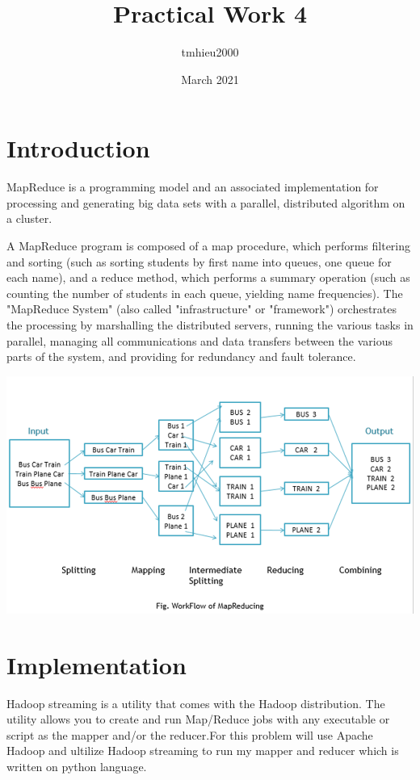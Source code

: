\documentclass{article}
\title{Practical Work 4}
\author{tmhieu2000}
\date{March 2021}
\begin{document}
\maketitle

\section{Introduction}
MapReduce is a programming model and an associated implementation for processing and generating big data sets with a parallel, distributed algorithm on a cluster.

A MapReduce program is composed of a map procedure, which performs filtering and sorting (such as sorting students by first name into queues, one queue for each name), and a reduce method, which performs a summary operation (such as counting the number of students in each queue, yielding name frequencies). The "MapReduce System" (also called "infrastructure" or "framework") orchestrates the processing by marshalling the distributed servers, running the various tasks in parallel, managing all communications and data transfers between the various parts of the system, and providing for redundancy and fault tolerance.

\includegraphics[width=\textwidth,height=\textheight,keepaspectratio]{fig/111.png}
\section{Implementation}
Hadoop streaming is a utility that comes with the Hadoop distribution. The utility allows you to create and run Map/Reduce jobs with any executable or script as the mapper and/or the reducer.For this problem will use Apache Hadoop and ultilize Hadoop streaming to run my mapper and reducer which is written on python language.
\end{document}
